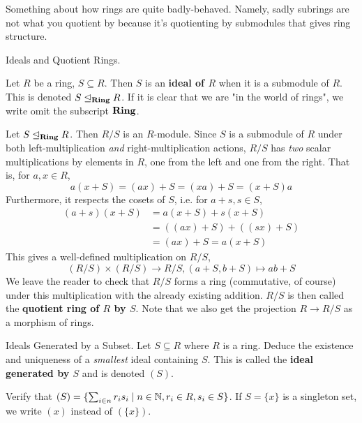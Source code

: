 \documentclass[../book.tex]{subfiles}
\begin{document}
\begin{rmk} 
    Something about how rings are quite badly-behaved.
    Namely, sadly subrings are not what you quotient by
    because it's quotienting by submodules that gives ring structure. 
\end{rmk}

\begin{dfn} Ideals and Quotient Rings. 

    Let $R$ be a ring, $S \subseteq R$. 
    Then $S$ is an \textbf{ideal of $R$} when it is a submodule of $R$. 
    This is denoted $S \trianglelefteq_{\mathbf{Ring}} R$. 
    If it is clear that we are "in the world of rings", 
    we write omit the subscript $\mathbf{Ring}$. 
    
    Let $S \trianglelefteq_{\mathbf{Ring}} R$. Then $R/S$ is an $R$-module. 
    Since $S$ is a submodule of $R$ under both left-multiplication \emph{and}
    right-multiplication actions, 
    $R/S$ has \emph{two} scalar multiplications by elements in $R$,
    one from the left and one from the right. 
    That is, for $a, x \in R$, \[
        a (x + S) = (ax) + S = (xa) + S = (x + S) a
    \]
    Furthermore, it respects the cosets of $S$, i.e. for $a + s, s \in S$, 
    \begin{align*}
        (a + s)(x + S) &= a (x + S) + s (x + S) \\
        &= ((ax) + S) + ((sx) + S) \\
        &= (ax) + S = a (x + S)
    \end{align*}
    This gives a well-defined multiplication on $R/S$, \[
        (R/S)\times(R/S) \to R/S, (a+S,b+S) \mapsto ab+S
    \]
    We leave the reader to check that $R/S$ forms a ring (commutative, of course)
    under this multiplication with the already existing addition. 
    $R/S$ is then called the \textbf{quotient ring of $R$ by $S$}. 
    Note that we also get the projection $R \to R/S$ as a morphism of rings. 
\end{dfn}

\begin{ex} Ideals Generated by a Subset. 
    Let $S \subseteq R$ where $R$ is a ring. 
    Deduce the existence and uniqueness of a \emph{smallest} ideal containing $S$.
    This is called the \textbf{ideal generated by $S$} and 
    is denoted $(S)$. 
    
    Verify that $(S) = 
    \{ \sum_{i \in n} r_i s_i \mid n \in \mathbb{N}, r_i \in R, s_i \in S\}$. 
    If $S = \{x\}$ is a singleton set, we write $(x)$ instead of $(\{x\})$. 
\end{ex}
\end{document}
